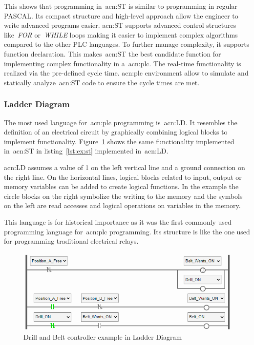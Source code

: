This shows that programming in~\acrshort{acn:ST} is similar to programming in regular PASCAL.
Its compact structure and high-level approach allow the engineer to write advanced programs easier.
\acrshort{acn:ST} supports advanced control structures like~\textit{FOR} or~\textit{WHILE} loops making it easier to implement complex algorithms compared to the other PLC languages. 
To further manage complexity, it supports function declaration.
This makes~\acrshort{acn:ST} the best candidate function for implementing complex functionality in a~\acrshort{acn:plc}.
The real-time functionality is realized via the pre-defined cycle time.
\acrshort{acn:plc} environment allow to simulate and statically analyze~\acrshort{acn:ST} code to ensure the cycle times are met.

\subsubsection{Ladder Diagram}

The most used language for~\acrshort{acn:plc} programming is~\acrfull{acn:LD}.
It resembles the definition of an electrical circuit by graphically combining logical blocks to implement functionality.
Figure~\ref{fig:drill:ld} shows the same functionality implemented in~\acrshort{acn:ST} in listing~\ref{lst:ex:st} implemented in~\acrshort{acn:LD}.

\acrshort{acn:LD} assumes a value of 1 on the left vertical line and a ground connection on the right line.
On the horizontal lines, logical blocks related to input, output or memory variables can be added to create logical functions.
In the example the circle blocks on the right symbolize the writing to the memory and the symbols on the left are read accesses and logical operations on variables in the memory.

This language is for historical importance as it was the first commonly used programming language for~\acrshort{acn:plc} programming.
Its structure is like the one used for programming traditional electrical relays.

\begin{figure}[h]
	\includegraphics[width=\textwidth]{Figures/belt_drill_ld.png}
	\caption[Drill and Belt controller example in Ladder Diagram]{Drill and Belt controller example in Ladder Diagram}
	\label{fig:drill:ld}
\end{figure}